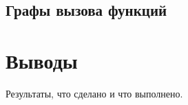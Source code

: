 \documentclass[a4paper,12pt]{report}
\begin{document}
\section{Графы вызова функций}





\chapter*{Выводы}

Результаты, что сделано и что выполнено.
\end{document}
